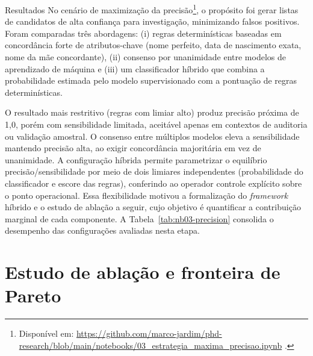 \begin{chapter}{Resultados}
No cenário de maximização da precisão\footnote{Disponível em: \url{https://github.com/marco-jardim/phd-research/blob/main/notebooks/03_estrategia_maxima_precisao.ipynb} \cite{Jardim2026phdrepo}.}, o propósito foi gerar listas de candidatos de alta confiança para investigação, minimizando falsos positivos. Foram comparadas três abordagens: (i) regras determinísticas baseadas em concordância forte de atributos-chave (nome perfeito, data de nascimento exata, nome da mãe concordante), (ii) consenso por unanimidade entre modelos de aprendizado de máquina e (iii) um classificador híbrido que combina a probabilidade estimada pelo modelo supervisionado com a pontuação de regras determinísticas.

O resultado mais restritivo (regras com limiar alto) produz precisão próxima de 1,0, porém com sensibilidade limitada, aceitável apenas em contextos de auditoria ou validação amostral. O consenso entre múltiplos modelos eleva a sensibilidade mantendo precisão alta, ao exigir concordância majoritária em vez de unanimidade. A configuração híbrida permite parametrizar o equilíbrio precisão/sensibilidade por meio de dois limiares independentes (probabilidade do classificador e escore das regras), conferindo ao operador controle explícito sobre o ponto operacional. Essa flexibilidade motivou a formalização do \textit{framework} híbrido e o estudo de ablação a seguir, cujo objetivo é quantificar a contribuição marginal de cada componente. A Tabela~\ref{tab:nb03-precision} consolida o desempenho das configurações avaliadas nesta etapa.



\section{Estudo de ablação e fronteira de Pareto}
\label{sec:cap5-ablacao-pareto}


\end{chapter}
